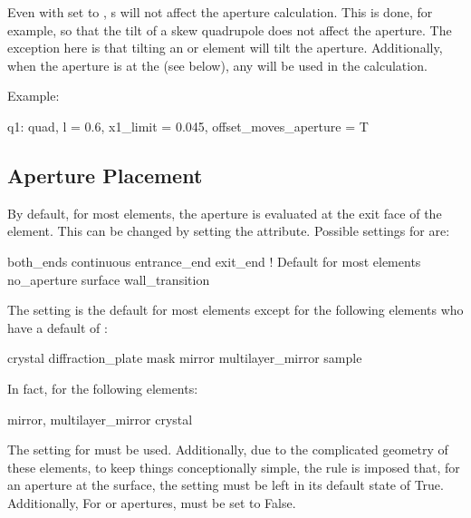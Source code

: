 Even with  set to , s will not affect the aperture
calculation. This is done, for example, so that the tilt of a skew quadrupole does not affect the
aperture. The exception here is that tilting an  or  element will
tilt the aperture. Additionally, when the aperture is at the  (see below), any 
will be used in the calculation.

Example:
\begin{example}
  q1: quad, l = 0.6, x1_limit = 0.045, offset_moves_aperture = T
\end{example}

\subsection{Aperture Placement}
\label{s:ap.place}

By default, for most elements, the aperture is evaluated at the exit face of the element. This can
be changed by setting the  attribute.  Possible settings for  are:
\begin{example}
  both_ends
  continuous
  entrance_end
  exit_end       ! Default for most elements
  no_aperture
  surface  
  wall_transition
\end{example}
The  setting is the default for most elements except for
the following elements who have a default of :
\begin{example}
  crystal
  diffraction_plate
  mask
  mirror
  multilayer_mirror
  sample
\end{example}

In fact, for the following elements:
\begin{example}
  mirror, 
  multilayer_mirror
  crystal
\end{example}
The  setting for  must be used.  Additionally, due to the complicated
geometry of these elements, to keep things conceptionally simple, the rule is imposed that, for an
aperture at the surface, the  setting must be left in its default state of
True. Additionally, For  or  apertures, 
must be set to False.

